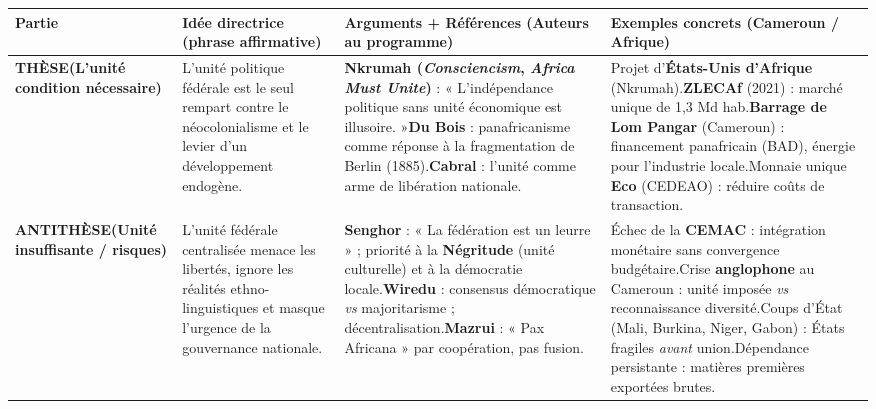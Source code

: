 \documentclass[11pt]{article}
\begin{document}
\begin{popfigure}
\begin{center}
\begin{tabularx}{\linewidth}{|>{\bfseries}l|X|X|X|}
\hline
\rowcolor{popblueL}
\textbf{Partie} & \textbf{Idée directrice (phrase affirmative)} & \textbf{Arguments + Références (Auteurs au programme)} & \textbf{Exemples concrets (Cameroun / Afrique)} \\
\hline
\textbf{THÈSE}\newline(L'unité condition nécessaire) & L'unité politique fédérale est le seul rempart contre le néocolonialisme et le levier d'un développement endogène. & \textbf{Nkrumah (\textit{Consciencism}, \textit{Africa Must Unite})} : « L'indépendance politique sans unité économique est illusoire. »\newline\textbf{Du Bois} : panafricanisme comme réponse à la fragmentation de Berlin (1885).\newline\textbf{Cabral} : l'unité comme arme de libération nationale. & Projet d'\textbf{États-Unis d'Afrique} (Nkrumah).\newline\textbf{ZLECAf} (2021) : marché unique de 1,3 Md hab.\newline\textbf{Barrage de Lom Pangar} (Cameroun) : financement panafricain (BAD), énergie pour l'industrie locale.\newline Monnaie unique \textbf{Eco} (CEDEAO) : réduire coûts de transaction. \\
\hline
\textbf{ANTITHÈSE}\newline(Unité insuffisante / risques) & L'unité fédérale centralisée menace les libertés, ignore les réalités ethno-linguistiques et masque l'urgence de la gouvernance nationale. & \textbf{Senghor} : « La fédération est un leurre » ; priorité à la \textbf{Négritude} (unité culturelle) et à la démocratie locale.\newline\textbf{Wiredu} : consensus démocratique \textit{vs} majoritarisme ; décentralisation.\newline\textbf{Mazrui} : « Pax Africana » par coopération, pas fusion. & Échec de la \textbf{CEMAC} : intégration monétaire sans convergence budgétaire.\newline Crise \textbf{anglophone} au Cameroun : unité imposée \textit{vs} reconnaissance diversité.\newline Coups d'État (Mali, Burkina, Niger, Gabon) : États fragiles \textit{avant} union.\newline Dépendance persistante : matières premières exportées brutes. \\

\end{tabularx}
\end{center}
\end{popfigure}
\end{document}
